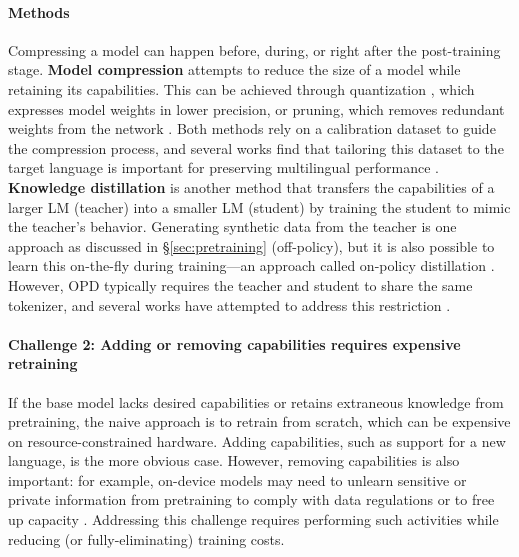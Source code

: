\documentclass[11pt,a4paper]{article}
\begin{document}
\paragraph{Methods}
Compressing a model can happen before, during, or right after the post-training stage.
\textbf{Model compression} attempts to reduce the size of a model while retaining its capabilities.
This can be achieved through quantization \citep{frantar2023optq,lin-etal-2025-awq}, which expresses model weights in lower precision, or
pruning, which removes redundant weights from the network \citep{zeng-etal-2024-multilingual,kim-etal-2024-pruning}.
Both methods rely on a calibration dataset to guide the compression process, and several works find that tailoring this dataset to the target language is important for preserving multilingual performance \citep{chimoto-etal-2026-calibrating,kurz-etal-2026-limitations}.
\textbf{Knowledge distillation} is another method that transfers the capabilities of a larger LM (teacher) into a smaller LM (student) by training the student to mimic the teacher's behavior.
Generating synthetic data from the teacher is one approach as discussed in \S\ref{sec:pretraining} (off-policy), but it is also possible to learn this on-the-fly during training---an approach called on-policy distillation \citep[OPD,][]{agarwal2024onpolicydistillationlanguagemodels}.
However, OPD typically requires the teacher and student to share the same tokenizer, and several works have attempted to address this restriction \citep{gholami-etal-2024-gold,minixhofer2025universal,boizard2025towards}.

\paragraph{Challenge 2: Adding or removing capabilities \iconalignment{} requires expensive retraining \iconcompute{}}
If the base model lacks desired capabilities or retains extraneous knowledge from pretraining,
the naive approach is to retrain from scratch, which can be expensive on resource-constrained hardware.
Adding capabilities, such as support for a new language, is the more obvious case.
However, removing capabilities is also important: for example, on-device models may need to unlearn sensitive or private information from pretraining to comply with data regulations or to free up capacity \citep{habernal-etal-2023-privacy}.
Addressing this challenge requires performing such activities while reducing (or fully-eliminating) training costs.
\end{document}
